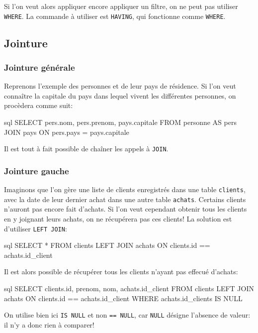 \documentclass[a4paper]{scrartcl}
\begin{document}
			Si l'on veut alors appliquer encore appliquer un filtre, on ne peut pas utiliser \texttt{WHERE}.
			La commande à utiliser est \texttt{HAVING}, qui fonctionne comme \texttt{WHERE}.

		\subsection{Jointure}
			\subsubsection{Jointure générale}
				\semidef Reprenons l'exemple des personnes et de leur pays de résidence.
				Si l'on veut connaître la capitale du pays dans lequel vivent les différentes personnes, on procèdera comme suit:
				\begin{code}{sql}
					SELECT pers.nom, pers.prenom, pays.capitale
					FROM personne AS pers
					JOIN pays
					ON pers.pays = pays.capitale
				\end{code}

				\rem Il est tout à fait possible de chaîner les appels à \texttt{JOIN}.

			\subsubsection{Jointure gauche}
				\semidef Imaginons que l'on gère une liste de clients enregistrés dans une table \texttt{clients}, 
				avec la date de leur dernier achat dans une autre table \texttt{achats}.
				Certains clients n'auront pas encore fait d'achats. 
				Si l'on veut cependant obtenir tous les clients en y joignant leurs achats, on ne récupérera pas ces clients!
				La solution est d'utiliser \texttt{LEFT JOIN}:
				\begin{code}{sql}
					SELECT *
					FROM clients
					LEFT JOIN achats ON clients.id == achats.id_client
				\end{code}

				Il est alors possible de récupérer tous les clients n'ayant pas effecué d'achats:
				\begin{code}{sql}
					SELECT clients.id, prenom, nom, achats.id_client
					FROM clients
					LEFT JOIN achats ON clients.id == achats.id_client
					WHERE achats.id_clients IS NULL
				\end{code}

				\rem On utilise bien ici \texttt{IS NULL} et non \texttt{== NULL}, car \texttt{NULL} désigne l'absence de valeur: il n'y a donc rien à comparer!
\end{document}
